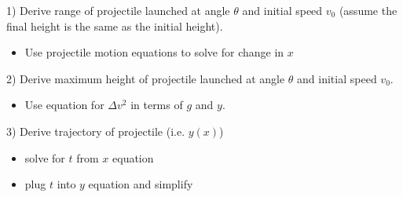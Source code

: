 \documentclass{article}
\begin{document}
   
1) Derive range of projectile launched at angle $\theta$ and initial speed $v_{0}$ (assume the final height is the same as the initial height).
\begin{itemize}
\item Use projectile motion equations to solve for change in $x$
\end{itemize}

\newpage


2) Derive maximum height of projectile launched at angle $\theta$ and initial speed $v_{0}$.
\begin{itemize}    
    \item Use equation for $\Delta v^2$ in terms of $g$ and $y$.
\end{itemize}

\newpage

3) Derive trajectory of projectile (i.e. $y(x)$)

\begin{itemize}
    \item solve for $t$ from $x$ equation
    \item plug $t$ into $y$ equation and simplify
\end{itemize}
\end{document}
